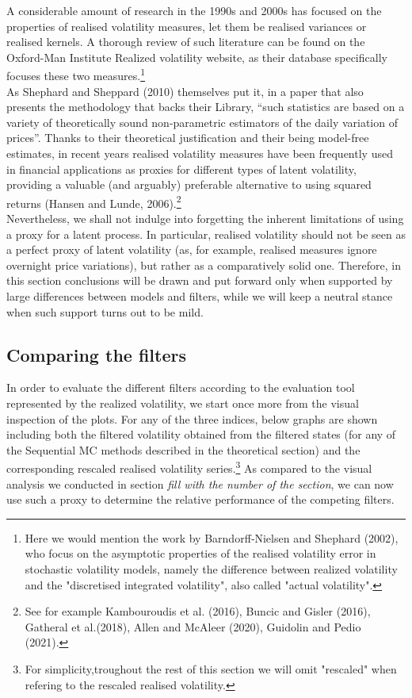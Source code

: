 \documentclass[
]{book}
\theoremstyle{break}
\theoremstyle{nonumberplain}
\begin{document}
A considerable amount of research in the 1990s and 2000s has focused on
the properties of realised volatility measures, let them be realised
variances or realised kernels. A thorough review of such literature can
be found on the Oxford-Man Institute Realized volatility website, as
their database specifically focuses these two
measures.\footnote{Here we would mention the work by Barndorff‐Nielsen and Shephard (2002), who focus on the asymptotic properties of the realised volatility error in stochastic volatility models, namely the difference between realized volatility and the "discretised integrated volatility", also called "actual volatility".}\\
As Shephard and Sheppard (2010) themselves put it, in a paper that also
presents the methodology that backs their Library, ``such statistics are
based on a variety of theoretically sound non-parametric estimators of
the daily variation of prices''. Thanks to their theoretical
justification and their being model-free estimates, in recent years
realised volatility measures have been frequently used in financial
applications as proxies for different types of latent volatility,
providing a valuable (and arguably) preferable alternative to using
squared returns (Hansen and Lunde,
2006).\footnote{See for example Kambouroudis et al. (2016), Buncic and Gisler (2016), Gatheral et al.(2018), Allen and McAleer (2020), Guidolin and Pedio (2021).}\\
Nevertheless, we shall not indulge into forgetting the inherent
limitations of using a proxy for a latent process. In particular,
realised volatility should not be seen as a perfect proxy of latent
volatility (as, for example, realised measures ignore overnight price
variations), but rather as a comparatively solid one. Therefore, in this
section conclusions will be drawn and put forward only when supported by
large differences between models and filters, while we will keep a
neutral stance when such support turns out to be mild.

\subsection{Comparing the filters}

In order to evaluate the different filters according to the evaluation
tool represented by the realized volatility, we start once more from the
visual inspection of the plots. For any of the three indices, below
graphs are shown including both the filtered volatility obtained from
the filtered states (for any of the Sequential MC methods described in
the theoretical section) and the corresponding rescaled realised
volatility
series.\footnote{For simplicity,troughout the rest of this section we will omit "rescaled" when refering to the rescaled realised volatility.}
As compared to the visual analysis we conducted in section
\textit{fill with the number of the section}, we can now use such a
proxy to determine the relative performance of the competing filters.\\
\end{document}
